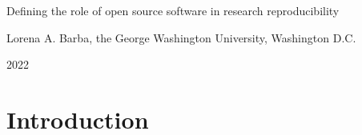 \documentclass{statement}
\newlength{\up}
\begin{document}

\renewcommand{\thepage} {\arabic{page}}

\thispagestyle{empty}

{ \Huge Defining the role of open source software in research reproducibility} 
\medskip

Lorena A. Barba, the George Washington University, Washington D.C. 

2022



\vspace{1cm}

\section*{Introduction}
\vspace{\up}




{\small
%
}



\end{document}
